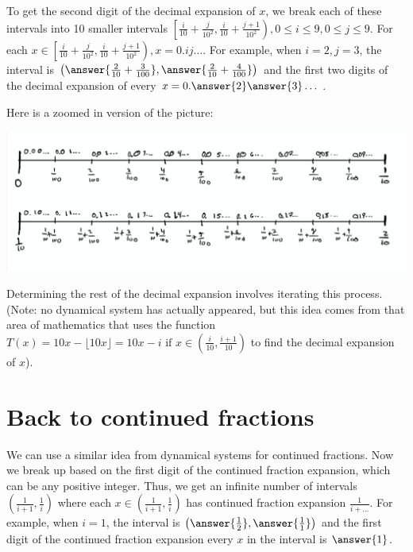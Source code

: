 \documentclass{ximera}
\begin{document}
To get the second digit of the decimal expansion of $x$, we break each of these intervals into 10 smaller intervals $\left[\frac{i}{10}+\frac{j}{10^2},\frac{i}{10}+\frac{j+1}{10^2}\right), 0\leq i\leq 9,0\leq j\leq 9$. For each $x\in\left[\frac{i}{10}+\frac{j}{10^2},\frac{i}{10}+\frac{j+1}{10^2}\right), x=0.ij\dots.$ For example, when $i=2,j=3$, the interval is $\left(\answer{\frac{2}{10}+\frac{3}{100}},\answer{\frac{2}{10}+\frac{4}{100}}\right)$ and the first two digits of the decimal expansion of every $x=0.\answer{2}\answer{3}\dots$.

Here is a zoomed in version of the picture:
\begin{image}
 \includegraphics[width=\textwidth]{zoomeddecimal}
\end{image}

Determining the rest of the decimal expansion involves iterating this process. (Note: no dynamical system has actually appeared, but this idea comes from that area of mathematics that uses the function $T(x)=10x-\lfloor 10x\rfloor=10x-i \textrm{ if }x\in\left(\frac{i}{10},\frac{i+1}{10}\right)$ to find the decimal expansion of $x$).

\section*{Back to continued fractions}
We can use a similar idea from dynamical systems for continued fractions. Now we break up based on the first digit of the continued fraction expansion, which can be any positive integer. Thus, we get an infinite number of intervals $\left(\frac{1}{i+1},\frac{1}{i}\right)$ where each $x\in\left(\frac{1}{i+1},\frac{1}{i}\right)$ has continued fraction expansion $\frac{1}{i+\dots}$.  For example, when $i=1$, the interval is $\left(\answer{\frac{1}{2}},\answer{\frac{1}{1}}\right)$ and the first digit of the continued fraction expansion every $x$ in the interval is $\answer{1}$. 
\end{document}
